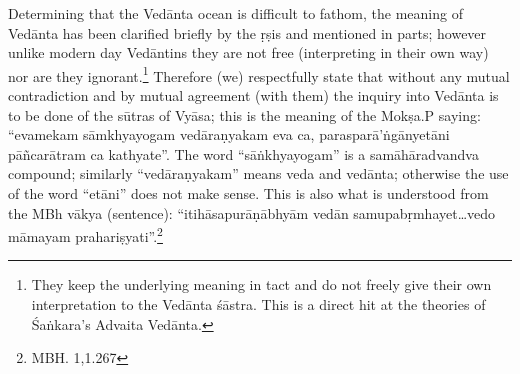Determining that the Vedānta ocean is difficult to fathom, the meaning of Vedānta has been clarified briefly by the ṛṣis and mentioned in parts; however unlike modern day Vedāntins they are not free (interpreting in their own way) nor are they ignorant.\footnote{They keep the underlying meaning in tact and do not freely give their own interpretation to the Vedānta śāstra. This is a direct hit at the theories of Śaṅkara’s Advaita Vedānta.} Therefore (we) respectfully state that without any mutual contradiction and by mutual agreement (with them) the inquiry into Vedānta is to be done of the sūtras of Vyāsa; this is the meaning of the Mokṣa.P saying: “evamekam sāmkhyayogam vedāraṇyakam eva ca, parasparā’ṅgānyetāni pāñcarātram ca kathyate”. The word “sāṅkhyayogam” is a samāhāradvan\-dva compound; similarly “vedāraṇyakam” means veda and vedānta; otherwise the use of the word “etāni” does not make sense. This is also what is understood from the MBh vākya (sentence): “itihāsapurāṇābhyām vedān samupabṛmhayet…vedo māmayam prahariṣyati”.\footnote{MBH. 1,1.267}

